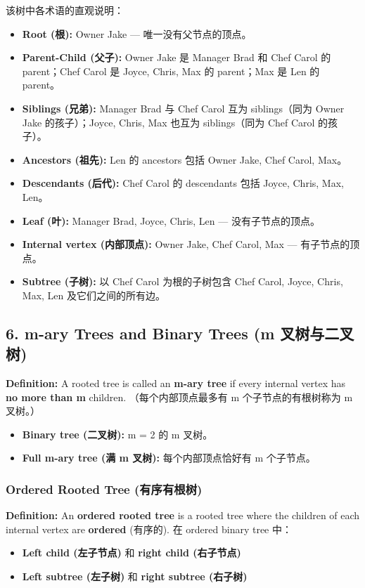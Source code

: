 \documentclass[10pt,a4paper,openany]{ctexbook}
\theoremstyle{definition}
\theoremstyle{remark}
\begin{document}
该树中各术语的直观说明：
\begin{itemize}
\item \textbf{Root (根):} Owner Jake — 唯一没有父节点的顶点。
\item \textbf{Parent-Child (父子):} Owner Jake 是 Manager Brad 和 Chef Carol 的 parent；Chef Carol 是 Joyce, Chris, Max 的 parent；Max 是 Len 的 parent。
\item \textbf{Siblings (兄弟):} Manager Brad 与 Chef Carol 互为 siblings（同为 Owner Jake 的孩子）；Joyce, Chris, Max 也互为 siblings（同为 Chef Carol 的孩子）。
\item \textbf{Ancestors (祖先):} Len 的 ancestors 包括 Owner Jake, Chef Carol, Max。
\item \textbf{Descendants (后代):} Chef Carol 的 descendants 包括 Joyce, Chris, Max, Len。
\item \textbf{Leaf (叶):} Manager Brad, Joyce, Chris, Len — 没有子节点的顶点。
\item \textbf{Internal vertex (内部顶点):} Owner Jake, Chef Carol, Max — 有子节点的顶点。
\item \textbf{Subtree (子树):} 以 Chef Carol 为根的子树包含 Chef Carol, Joyce, Chris, Max, Len 及它们之间的所有边。

\end{itemize}

\vspace{-2pt}

\subsection{6. m-ary Trees and Binary Trees (m 叉树与二叉树)}

\textbf{Definition:} A rooted tree is called an \textbf{m-ary tree} if every internal vertex has \textbf{no more than m} children.
（每个内部顶点最多有 m 个子节点的有根树称为 m 叉树。）
\begin{itemize}
\item \textbf{Binary tree (二叉树):} m = 2 的 m 叉树。
\item \textbf{Full m-ary tree (满 m 叉树):} 每个内部顶点恰好有 m 个子节点。

\end{itemize}

\subsubsection{Ordered Rooted Tree (有序有根树)}

\textbf{Definition:} An \textbf{ordered rooted tree} is a rooted tree where the children of each internal vertex are \textbf{ordered} (有序的).
在 ordered binary tree 中：
\begin{itemize}
\item \textbf{Left child (左子节点)} 和 \textbf{right child (右子节点)}
\item \textbf{Left subtree (左子树)} 和 \textbf{right subtree (右子树)}

\end{itemize}
\end{document}
